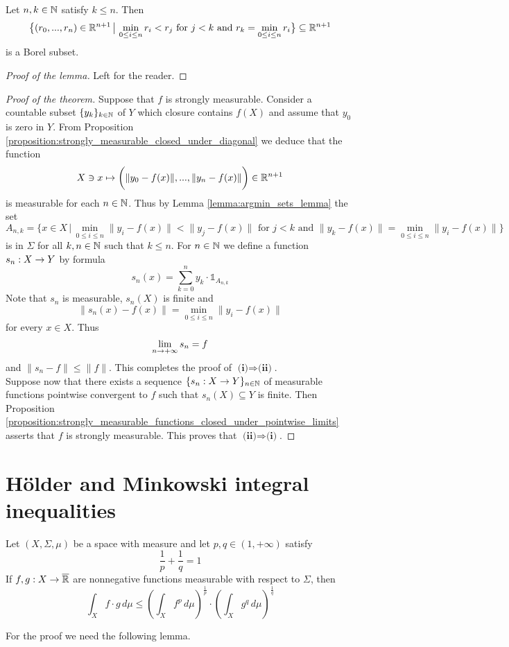 \begin{lemma}\label{lemma:argmin_sets_lemma}
    Let $n,k\in {\mathbb N}$ satisfy $k \leq n$. Then
    $$\big\{(r_0,...,r_n)\in {\mathbb R}^{n+1}\,\big|\,\min_{0\leq i\leq n} r_i < r_j\mbox{ for }j < k\mbox{ and }r_k = \min_{0\leq i\leq n} r_i\big\} \subseteq {\mathbb R}^{n+1}$$
    is a Borel subset.
\end{lemma}
\begin{proof}[Proof of the lemma]
    Left for the reader.
\end{proof}

\begin{proof}[Proof of the theorem]
    Suppose that $f$ is strongly measurable. Consider a countable subset $\{y_k\}_{k\in {\mathbb N}}$ of $Y$ which closure contains $f(X)$ and assume that $y_0$ is zero in $Y$. From Proposition \ref{proposition:strongly_measurable_closed_under_diagonal} we deduce that the function
    $$X\ni x\mapsto \bigg(\lVert y_0 - f(x)\rVert,...,\lVert y_n - f(x)\rVert \bigg)\in {\mathbb R}^{n+1}$$
    is measurable for each $n \in {\mathbb N}$. Thus by Lemma \ref{lemma:argmin_sets_lemma} the set
    $$A_{n,k} = \big\{x \in X\,\big|\,\min_{0\leq i\leq n}\lVert y_i - f(x)\rVert < \lVert y_j - f(x)\rVert \mbox{ for }j < k\mbox{ and }\lVert y_k - f(x)\rVert = \min_{0\leq i\leq n}\lVert y_i - f(x)\rVert\big\}$$
    is in $\Sigma$ for all $k,n\in {\mathbb N}$ such that $k \leq n$. For $n\in {\mathbb N}$ we define a function $s_n:X\rightarrow Y$ by formula
    $$s_n(x) = \sum_{k=0}^ny_k\cdot \mathbb{1}_{A_{n,k}}$$
    Note that $s_n$ is measurable, $s_n(X)$ is finite and
    $$\lVert s_n(x) - f(x)\rVert = \min_{0\leq i\leq n}\lVert y_i - f(x)\rVert$$
    for every $x \in X$. Thus
    $$\lim_{n\rightarrow +\infty}s_n = f$$
    and $\lVert s_n - f\rVert \leq  \lVert f\rVert$. This completes the proof of $\textbf{(i)}\Rightarrow \textbf{(ii)}$.\\
    Suppose now that there exists a sequence $\{s_n:X\rightarrow Y\}_{n\in {\mathbb N}}$ of measurable functions pointwise convergent to $f$ such that $s_n(X)\subseteq Y$ is finite. Then Proposition \ref{proposition:strongly_measurable_functions_closed_under_pointwise_limits} asserts that $f$ is strongly measurable. This proves that $\textbf{(ii)}\Rightarrow \textbf{(i)}$.
\end{proof}

\section{H{\"o}lder and Minkowski integral inequalities}

\begin{theorem}[H{\"o}lder]\label{theorem:holder_inequality}
    Let $(X,\Sigma,\mu)$ be a space with measure and let $p,q \in (1,+\infty)$ satisfy
    $$\frac{1}{p} + \frac{1}{q} = 1$$
    If $f,g:X\rightarrow \overline{{\mathbb R}}$ are nonnegative functions measurable with respect to $\Sigma$, then
    $$\int_X f\cdot g\,d\mu \leq \left(\int_X f^p\,d\mu\right)^{\frac{1}{p}}\cdot \left(\int_X g^q\,d\mu\right)^{\frac{1}{q}} $$
\end{theorem}
\noindent
For the proof we need the following lemma.

